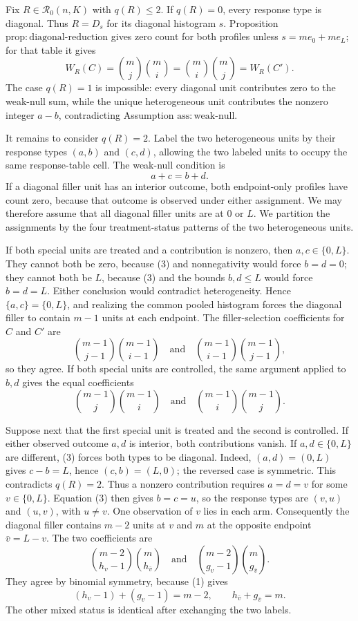Fix \(R\in\mathcal R_0(n,K)\) with \(q(R)\leq2\). If \(q(R)=0\), every response type is diagonal. Thus \(R=D_s\) for its diagonal histogram \(s\). Proposition \(\mathrm{prop{:}diagonal\text{-}reduction}\) gives zero count for both profiles unless \(s=me_0+me_L\); for that table it gives
\[
 W_R(C)=\binom mj\binom mi
 =\binom mi\binom mj=W_R(C').
 \tag{2}
\]
The case \(q(R)=1\) is impossible: every diagonal unit contributes zero to the weak-null sum, while the unique heterogeneous unit contributes the nonzero integer \(a-b\), contradicting Assumption \(\mathrm{ass{:}weak\text{-}null}\).

It remains to consider \(q(R)=2\). Label the two heterogeneous units by their response types \((a,b)\) and \((c,d)\), allowing the two labeled units to occupy the same response-table cell. The weak-null condition is
\[
 a+c=b+d.
 \tag{3}
\]
If a diagonal filler unit has an interior outcome, both endpoint-only profiles have count zero, because that outcome is observed under either assignment. We may therefore assume that all diagonal filler units are at \(0\) or \(L\). We partition the assignments by the four treatment-status patterns of the two heterogeneous units.

If both special units are treated and a contribution is nonzero, then \(a,c\in\{0,L\}\). They cannot both be zero, because (3) and nonnegativity would force \(b=d=0\); they cannot both be \(L\), because (3) and the bounds \(b,d\leq L\) would force \(b=d=L\). Either conclusion would contradict heterogeneity. Hence \(\{a,c\}=\{0,L\}\), and realizing the common pooled histogram forces the diagonal filler to contain \(m-1\) units at each endpoint. The filler-selection coefficients for \(C\) and \(C'\) are
\[
 \binom{m-1}{j-1}\binom{m-1}{i-1}
 \quad\text{and}\quad
 \binom{m-1}{i-1}\binom{m-1}{j-1},
 \tag{4}
\]
so they agree. If both special units are controlled, the same argument applied to \(b,d\) gives the equal coefficients
\[
 \binom{m-1}{j}\binom{m-1}{i}
 \quad\text{and}\quad
 \binom{m-1}{i}\binom{m-1}{j}.
 \tag{5}
\]

Suppose next that the first special unit is treated and the second is controlled. If either observed outcome \(a,d\) is interior, both contributions vanish. If \(a,d\in\{0,L\}\) are different, (3) forces both types to be diagonal. Indeed, \((a,d)=(0,L)\) gives \(c-b=L\), hence \((c,b)=(L,0)\); the reversed case is symmetric. This contradicts \(q(R)=2\). Thus a nonzero contribution requires \(a=d=v\) for some \(v\in\{0,L\}\). Equation (3) then gives \(b=c=u\), so the response types are \((v,u)\) and \((u,v)\), with \(u\neq v\). One observation of \(v\) lies in each arm. Consequently the diagonal filler contains \(m-2\) units at \(v\) and \(m\) at the opposite endpoint \(\bar v=L-v\). The two coefficients are
\[
 \binom{m-2}{h_v-1}\binom m{h_{\bar v}}
 \quad\text{and}\quad
 \binom{m-2}{g_v-1}\binom m{g_{\bar v}}.
 \tag{6}
\]
They agree by binomial symmetry, because (1) gives
\[
 (h_v-1)+(g_v-1)=m-2,
 \qquad h_{\bar v}+g_{\bar v}=m.
\]
The other mixed status is identical after exchanging the two labels.

